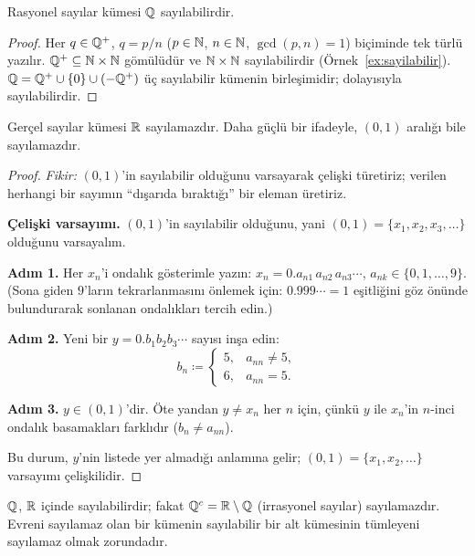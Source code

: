 \begin{teorem}[$\Q$ Sayılabilirdir]\label{thm:Qsayilabilir}
Rasyonel sayılar kümesi $\Q$ sayılabilirdir.
\end{teorem}

\begin{proof}
Her $q \in \mathbb{Q}^+$, $q = p/n$ ($p \in \mathbb{N}$, $n \in \mathbb{N}$, $\gcd(p,n) = 1$) biçiminde
tek türlü yazılır. $\mathbb{Q}^+ \subseteq \mathbb{N} \times \mathbb{N}$ gömülüdür ve $\mathbb{N} \times \mathbb{N}$
sayılabilirdir (Örnek~\ref{ex:sayilabilir}). $\mathbb{Q} = \mathbb{Q}^+ \cup \{0\} \cup (-\mathbb{Q}^+)$
üç sayılabilir kümenin birleşimidir; dolayısıyla sayılabilirdir.
\end{proof}

\begin{teorem}
\label{thm:Rsayilamaz}
Gerçel sayılar kümesi $\mathbb{R}$ sayılamazdır.
Daha güçlü bir ifadeyle, $(0,1)$ aralığı bile sayılamazdır.
\end{teorem}

\begin{proof}
\textit{Fikir:} $(0,1)$'in sayılabilir olduğunu varsayarak çelişki türetiriz;
verilen herhangi bir sayımın ``dışarıda bıraktığı'' bir eleman üretiriz.

\medskip

\textbf{Çelişki varsayımı.} $(0,1)$'in sayılabilir olduğunu, yani
$(0,1) = \{x_1, x_2, x_3, \ldots\}$ olduğunu varsayalım.

\textbf{Adım 1.} Her $x_n$'i ondalık gösterimle yazın:
$x_n = 0.a_{n1}\,a_{n2}\,a_{n3}\cdots$, $a_{nk} \in \{0,1,\ldots,9\}$.
(Sona giden $9$'ların tekrarlanmasını önlemek için: $0.999\cdots = 1$ eşitliğini
göz önünde bulundurarak sonlanan ondalıkları tercih edin.)

\textbf{Adım 2.} Yeni bir $y = 0.b_1 b_2 b_3 \cdots$ sayısı inşa edin:
\[
  b_n \coloneqq
  \begin{cases}
    5, & a_{nn} \neq 5, \\
    6, & a_{nn} = 5.
  \end{cases}
\]

\textbf{Adım 3.} $y \in (0,1)$'dir. Öte yandan $y \neq x_n$ her $n$ için,
çünkü $y$ ile $x_n$'in $n$-inci ondalık basamakları farklıdır ($b_n \neq a_{nn}$).

Bu durum, $y$'nin listede yer almadığı anlamına gelir; $(0,1) = \{x_1, x_2, \ldots\}$
varsayımı çelişkilidir.
\end{proof}

\begin{karsiornek}
$\Q$, $\mathbb{R}$ içinde sayılabilirdir; fakat $\mathbb{Q}^c = \mathbb{R} \setminus \mathbb{Q}$
(irrasyonel sayılar) sayılamazdır. Evreni sayılamaz olan bir kümenin
sayılabilir bir alt kümesinin tümleyeni sayılamaz olmak zorundadır.
\end{karsiornek}


